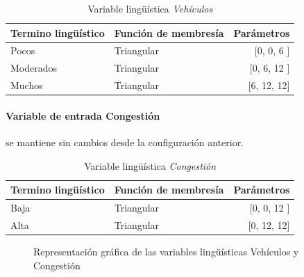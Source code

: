 \begin{table}[!h]
	\centering
	\begin{tabular}{llr} \toprule
		Termino lingüístico & Función de membresía & Parámetros \\ \midrule
		Pocos & Triangular & [0, 0, 6 ] \\
		Moderados & Triangular & [0, 6, 12 ] \\
		Muchos & Triangular & [6, 12, 12] \\ \bottomrule
	\end{tabular}
	\caption{Variable lingüística \textit{Vehículos}}
\end{table}


\paragraph{Variable de entrada Congestión} se mantiene sin cambios desde la configuración anterior.


\begin{table}[!h]
	\centering
	\begin{tabular}{llr} \toprule
		Termino lingüístico & Función de membresía & Parámetros \\ \midrule
		Baja & Triangular & [0, 0, 12 ] \\
		Alta & Triangular & [0, 12, 12] \\ \bottomrule
	\end{tabular}
	\caption{Variable lingüística \textit{Congestión}}
\end{table}

\begin{figure}[H]
	\centering
	\caption[Gráficas de las variables lingüísticas vehículos y congestión]{Representación gráfica de las variables lingüísticas Vehículos y Congestión }
\end{figure}

